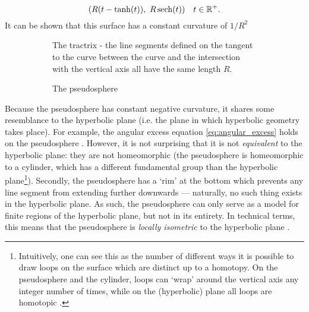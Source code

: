 $$ \qty(R(t - \tanh(t)),\ R\sech(t)) \quad t \in \real^+.$$
It can be shown that this surface has a constant curvature of $1/R^2$
\begin{figure}[ht]
    \begin{subfigure}[b]{0.5\textwidth}
        \centering
        
        \caption{The tractrix - the line segments defined on the tangent to the curve between the curve and the intersection with the vertical axis all have the same length $R$.}
        \label{fig:tractrix}
    \end{subfigure}
    \begin{subfigure}[b]{0.45\textwidth}
        \centering
        
        \caption{The pseudosphere}
        \label{fig:pseudosphere}
    \end{subfigure}
    \caption{}
\end{figure}
Because the pseudosphere has constant negative curvature, it shares some resemblance to the hyperbolic plane (i.e. the plane in which hyperbolic geometry takes place). For example, the angular excess equation \cref{eq:angular_excess} holds on the pseudosphere \cite{Needham1997}. However, it is not surprising that it is not \emph{equivalent} to the hyperbolic plane: they are not homeomorphic (the pseudosphere is homeomorphic to a cylinder, which has a different fundamental group than the hyperbolic plane\footnote{Intuitively, one can see this as the number of different ways it is possible to draw loops on the surface which are distinct up to a homotopy. On the pseudosphere and the cylinder, loops can `wrap' around the vertical axis any integer number of times, while on the (hyperbolic) plane all loops are homotopic \cite{Lee2000}.}). Secondly, the pseudosphere has a `rim' at the bottom which prevents any line segment from extending further downwards --- naturally, no such thing exists in the hyperbolic plane. As such, the pseudosphere can only serve as a model for finite regions of the hyperbolic plane, but not in its entirety. In technical terms, this means that the pseudosphere is \emph{locally isometric} to the hyperbolic plane \cite{Ghys2010}.

